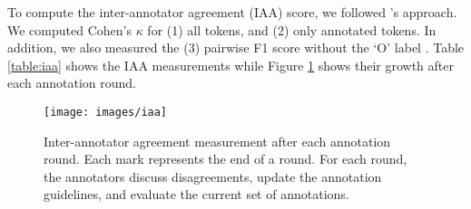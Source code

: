 \documentclass[11pt]{article}
\begin{document}
To compute the inter-annotator agreement (IAA) score, we followed \citet{Brandsen2020CreatingAD}'s approach.
We computed Cohen's $\kappa$ for (1) all tokens, and (2) only annotated tokens.  
In addition, we also measured the (3) pairwise F1 score without the `O' label \citep{Deleger2012BG}.
Table \ref{table:iaa} shows the IAA measurements while Figure \ref{fig:iaa} shows their growth after each annotation round.





\begin{figure}[t]
\centering
\texttt{[image: images/iaa]}
\caption{
  Inter-annotator agreement measurement after each annotation round.
  Each mark represents the end of a round. 
  For each round, the annotators discuss disagreements, update the annotation guidelines, and evaluate the current set of annotations.
}
\label{fig:iaa}
\end{figure}



\end{document}

